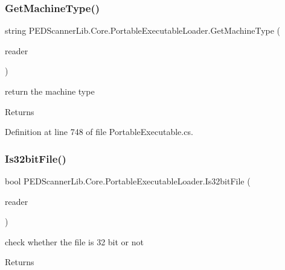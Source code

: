 \subsubsection{\texorpdfstring{Get\+Machine\+Type()}{GetMachineType()}}
{\footnotesize\ttfamily string P\+E\+D\+Scanner\+Lib.\+Core.\+Portable\+Executable\+Loader.\+Get\+Machine\+Type (\begin{DoxyParamCaption}\item[{\mbox{\hyperlink{class_p_e_d_scanner_lib_1_1_struct_1_1_pe_header_reader}{Pe\+Header\+Reader}}}]{reader }\end{DoxyParamCaption})}



return the machine type 

\begin{DoxyReturn}{Returns}

\end{DoxyReturn}


Definition at line 748 of file Portable\+Executable.\+cs.

\mbox{\label{class_p_e_d_scanner_lib_1_1_core_1_1_portable_executable_loader_ab40516998ff72efd721effcb1cc858e3}} 
\subsubsection{\texorpdfstring{Is32bit\+File()}{Is32bitFile()}}
{\footnotesize\ttfamily bool P\+E\+D\+Scanner\+Lib.\+Core.\+Portable\+Executable\+Loader.\+Is32bit\+File (\begin{DoxyParamCaption}\item[{\mbox{\hyperlink{class_p_e_d_scanner_lib_1_1_struct_1_1_pe_header_reader}{Pe\+Header\+Reader}}}]{reader }\end{DoxyParamCaption})}



check whether the file is 32 bit or not 

\begin{DoxyReturn}{Returns}

\end{DoxyReturn}


